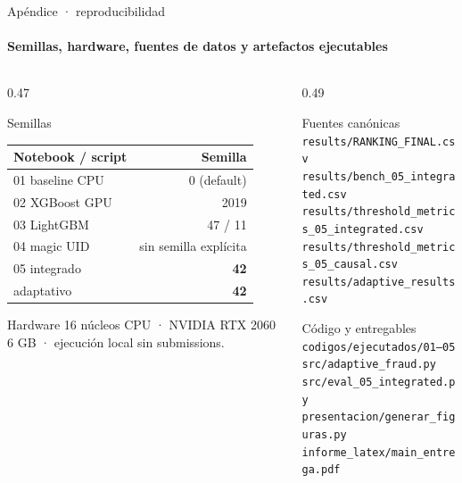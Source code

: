 \documentclass[aspectratio=169,11pt]{beamer}
\begin{document}
\appendix
\begin{frame}{Apéndice · reproducibilidad}
  \framesubtitle{Semillas, hardware, fuentes de datos y artefactos ejecutables}
  \begin{columns}[T]
    \begin{column}{0.47\textwidth}
      \begin{block}{Semillas}
        \small
        \begin{tabular}{@{}lr@{}}
          \toprule
          Notebook / script & Semilla\\
          \midrule
          01 baseline CPU & 0 (default)\\
          02 XGBoost GPU & 2019\\
          03 LightGBM & 47 / 11\\
          04 magic UID & sin semilla explícita\\
          05 integrado & \textbf{42}\\
          adaptativo & \textbf{42}\\
          \bottomrule
        \end{tabular}
      \end{block}
      \begin{block}{Hardware}
        \small 16 núcleos CPU · NVIDIA RTX 2060 6 GB · ejecución local sin submissions.
      \end{block}
    \end{column}
    \begin{column}{0.49\textwidth}
      \begin{block}{Fuentes canónicas}
        \scriptsize
        \texttt{results/RANKING\_FINAL.csv}\\
        \texttt{results/bench\_05\_integrated.csv}\\
        \texttt{results/threshold\_metrics\_05\_integrated.csv}\\
        \texttt{results/threshold\_metrics\_05\_causal.csv}\\
        \texttt{results/adaptive\_results.csv}
      \end{block}
      \begin{block}{Código y entregables}
        \scriptsize
        \texttt{codigos/ejecutados/01--05}\\
        \texttt{src/adaptive\_fraud.py}\\
        \texttt{src/eval\_05\_integrated.py}\\
        \texttt{presentacion/generar\_figuras.py}\\
        \texttt{informe\_latex/main\_entrega.pdf}
      \end{block}
    \end{column}
  \end{columns}
\end{frame}
\end{document}

